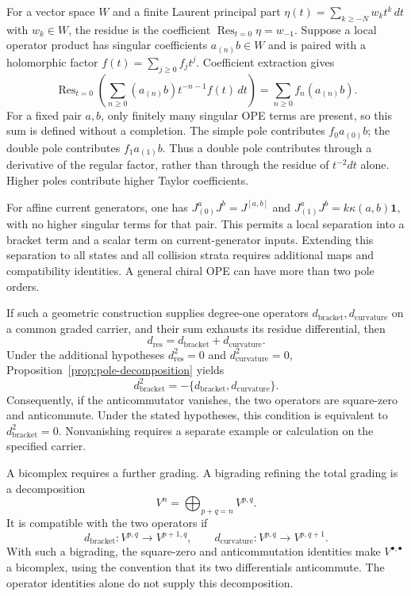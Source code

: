 \begin{remark}\label{rem:bicomplex-obstruction}
For a vector space $W$ and a finite Laurent principal part
$\eta(t)=\sum_{k\ge -N}w_k t^k\,dt$ with $w_k\in W$,
the residue is the coefficient $\operatorname{Res}_{t=0}\eta=w_{-1}$.
Suppose a local operator product has singular coefficients
$a_{(n)}b\in W$ and is paired with a holomorphic factor
$f(t)=\sum_{j\ge0}f_jt^j$.  Coefficient extraction gives
\[
\operatorname{Res}_{t=0}
 \left(\sum_{n\ge0}(a_{(n)}b)t^{-n-1}f(t)\,dt\right)
 =\sum_{n\ge0}f_n(a_{(n)}b).
\]
For a fixed pair $a,b$, only finitely many singular OPE terms are present,
so this sum is defined without a completion.
The simple pole contributes $f_0a_{(0)}b$; the double pole contributes
$f_1a_{(1)}b$.  Thus a double pole contributes through a derivative of
the regular factor, rather than through the residue of $t^{-2}dt$ alone.
Higher poles contribute higher Taylor coefficients.

For affine current generators, one has
$J^a_{(0)}J^b=J^{[a,b]}$ and
$J^a_{(1)}J^b=k\kappa(a,b)\mathbf1$, with no higher singular terms
for that pair.  This permits a local separation into a bracket term and
a scalar term on current-generator inputs.  Extending this separation
to all states and all collision strata requires additional maps and
compatibility identities.  A general chiral OPE can have more than two
pole orders.

If such a geometric construction supplies degree-one operators
$d_{\mathrm{bracket}},d_{\mathrm{curvature}}$ on a common graded carrier,
and their sum exhausts its residue differential, then
\begin{equation}\label{eq:pole-decomposition}
d_{\mathrm{res}}=d_{\mathrm{bracket}}+d_{\mathrm{curvature}}.
\end{equation}
Under the additional hypotheses $d_{\mathrm{res}}^2=0$ and
$d_{\mathrm{curvature}}^2=0$, Proposition~\ref{prop:pole-decomposition} yields
\[
d_{\mathrm{bracket}}^2
=-\{d_{\mathrm{bracket}},d_{\mathrm{curvature}}\}.
\]
Consequently, if the anticommutator vanishes, the two operators are
square-zero and anticommute.  Under the stated hypotheses, this condition
is equivalent to $d_{\mathrm{bracket}}^2=0$.
Nonvanishing requires a separate example or calculation on the specified carrier.

A bicomplex requires a further grading.  A bigrading refining the total
grading is a decomposition
\[
V^n=\bigoplus_{p+q=n}V^{p,q}.
\]
It is compatible with the two operators if
\[
d_{\mathrm{bracket}}:V^{p,q}\longrightarrow V^{p+1,q},
\qquad
d_{\mathrm{curvature}}:V^{p,q}\longrightarrow V^{p,q+1}.
\]
With such a bigrading, the square-zero and anticommutation identities
make $V^{\bullet,\bullet}$ a bicomplex, using the convention that its
two differentials anticommute.  The operator identities alone do not
supply this decomposition.


\end{remark}
